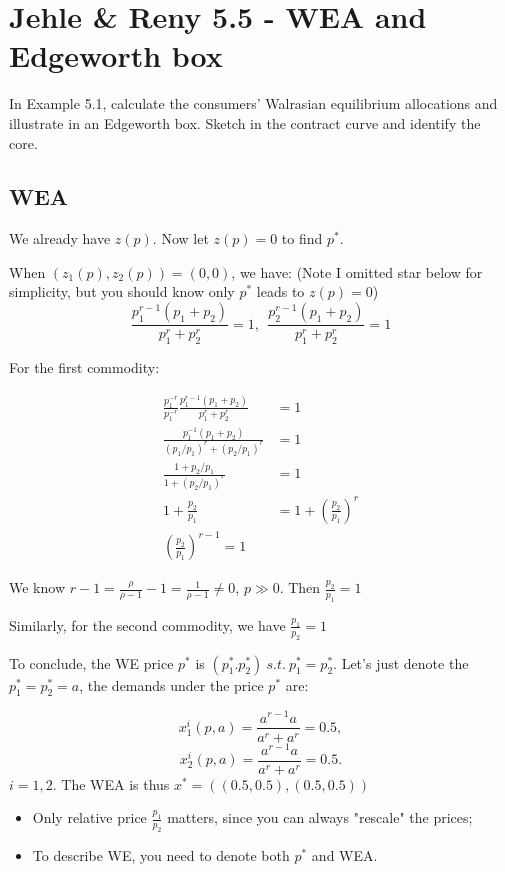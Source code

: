 \documentclass{article}
\begin{document}
\section{Jehle \& Reny 5.5 - WEA and Edgeworth box}

In Example 5.1, calculate the consumers' Walrasian equilibrium allocations and illustrate in an
Edgeworth box. Sketch in the contract curve and identify the core.


\subsection{WEA}

We already have $z(p)$. Now let $z(p)=0$ to find $p^*$.

When $ (z_1(p),z_2(p)) = (0,0)$, we have:
(Note I omitted star below for simplicity, but you should know only $p^*$ leads to $z(p)=0$)
$$\frac{p^{r-1}_1 (p_1+p_2)}{p_1^r+p_2^r} =1, \ \ \frac{p^{r-1}_2 (p_1+p_2)}{p_1^r+p_2^r} =1$$

For the first commodity:

\begin{align*}
\frac{p^{-r}_1}{p^{-r}_1}\frac{p^{r-1}_1 (p_1+p_2)}{p_1^r+p_2^r} &=1 \\
\frac{p^{-1}_1 (p_1+p_2)}{(p_1/p_1)^r+(p_2/p_1)^r} &=1 \\
\frac{1+p_2/p_1}{1+(p_2/p_1)^r} &=1 \\
1+\frac{p_2}{p_1} &=1+(\frac{p_2}{p_1})^r \\
(\frac{p_2}{p_1})^{r-1} = 1
\end{align*}

We know $r-1 = \frac{\rho}{\rho-1} -1 = \frac{1}{\rho-1} \ne 0$, $p \gg 0$. Then $\frac{p_2}{p_1} = 1$

Similarly, for the second commodity, we have  $\frac{p_1}{p_2} = 1$

To conclude, the WE price $p^*$ is $(p^*_1.p^*_2) \ s.t.\ p^*_1=p^*_2$. Let's just denote the $p^*_1=p^*_2 = a$, the demands under the price $p^*$ are:

$$x^i_1(p,a) = \frac{a^{r-1} a}{a^r+a^r} = 0.5 ,$$
$$x^i_2(p,a) = \frac{a^{r-1} a}{a^r+a^r} = 0.5.$$
$i = 1,2$. The WEA is thus $x^* = ((0.5,0.5),(0.5,0.5))$
\begin{mdframed}[backgroundcolor=blue!20,linecolor=white]

\begin{itemize}
\item Only relative price $\frac{p_1}{p_2}$ matters, since you can always "rescale" the prices;
\item To describe WE, you need to denote both $p^*$ and WEA.
\end{itemize}
\end{mdframed}
\end{document}
